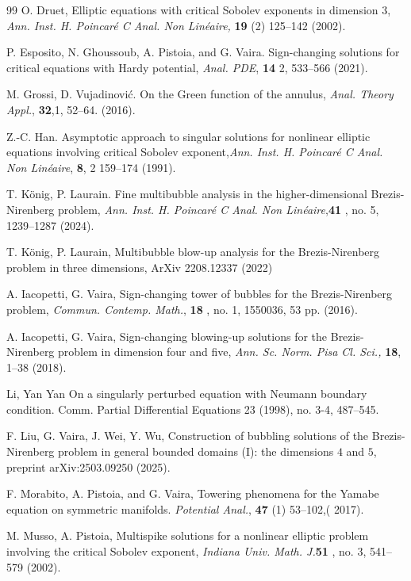 \documentclass[11pt,a4paper]{amsart}
\theoremstyle{definition}
\renewcommand{\(}{\left(}
\renewcommand{\)}{\right)}
\begin{document}
\begin{thebibliography}{99}
O. Druet, Elliptic equations with critical Sobolev exponents in dimension 3,{ \it Ann. Inst. H.
Poincar\'e C Anal. Non Lin\'eaire,} {\bf 19} (2) 125--142 (2002).

P. Esposito, N. Ghoussoub, A. Pistoia, and G. Vaira. Sign-changing solutions for critical
equations with Hardy potential, {\it  Anal. PDE}, {\bf 14} 2, 533--566 (2021).

M. Grossi, D. Vujadinović. On the Green function of the annulus, 
{\it  Anal. Theory Appl.}, {\bf 32},1, 52--64. (2016).

Z.-C. Han. Asymptotic approach to singular solutions for nonlinear elliptic equations involving critical Sobolev exponent,{\it Ann. Inst. H. Poincar\'e C Anal. Non Lin\'eaire}, {\bf 8}, 2 159--174
(1991).

T. K\"onig, P. Laurain. Fine multibubble analysis in the higher-dimensional Brezis-
Nirenberg problem, {\it Ann. Inst. H. Poincar\'e C Anal. Non Lin\'eaire},{\bf 41} , no. 5, 1239--1287 (2024).

T. K\"onig, P. Laurain, Multibubble blow-up analysis for the Brezis-Nirenberg problem in
three dimensions, ArXiv 2208.12337 (2022)

A. Iacopetti, G. Vaira, 
Sign-changing tower of bubbles for the Brezis-Nirenberg problem,{\it
Commun. Contemp. Math.}, {\bf 18} , no. 1, 1550036, 53 pp. (2016).

A. Iacopetti, G. Vaira, Sign-changing blowing-up solutions for the Brezis-Nirenberg problem in dimension four and five, {\it Ann. Sc. Norm. Pisa Cl. Sci.,} {\bf 18},  1--38 (2018).

Li, Yan Yan  
On a singularly perturbed equation with Neumann boundary condition.
Comm. Partial Differential Equations 23 (1998), no. 3-4, 487–545.

F. Liu, G. Vaira, J. Wei, Y. Wu, Construction of bubbling solutions of the Brezis-Nirenberg problem in general bounded domains (I): the dimensions $4$ and $5$, preprint arXiv:2503.09250 (2025).

F. Morabito, A. Pistoia, and G. Vaira, Towering phenomena for the Yamabe equation on
symmetric manifolds. {\it Potential Anal.}, {\bf 47} (1) 53--102,( 2017).
	
M. Musso, A. Pistoia, Multispike solutions for a nonlinear elliptic problem involving the critical Sobolev exponent, {\it Indiana Univ. Math. J.}{\bf 51} , no. 3, 541--579 (2002).


\end{thebibliography}
\end{document}
